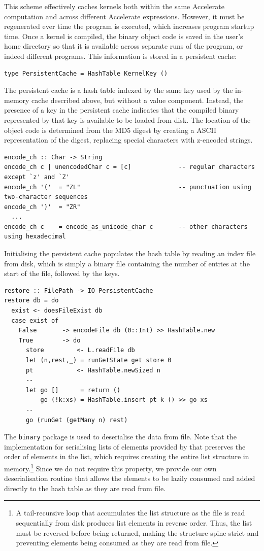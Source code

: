 This scheme effectively caches kernels both within the same Accelerate
computation and across different Accelerate expressions. However, it must be
regenerated ever time the program is executed, which increases program startup
time. Once a kernel is compiled, the binary object code is saved in the user's
home directory so that it is available across separate runs of the program, or
indeed different programs. This information is stored in a persistent cache:
%
\begin{lstlisting}[style=haskell,numbers=none]
type PersistentCache = HashTable KernelKey ()
\end{lstlisting}

The persistent cache is a hash table indexed by the same key used by the
in-memory cache described above, but without a value component. Instead, the
presence of a key in the persistent cache indicates that the compiled binary
represented by that key is available to be loaded from disk. The location of the
object code is determined from the MD5 digest by creating a ASCII representation
of the digest, replacing special characters with z-encoded strings.
%
\begin{lstlisting}[style=haskell]
encode_ch :: Char -> String
encode_ch c | unencodedChar c = [c]             -- regular characters except `z' and `Z'
encode_ch '('  = "ZL"                           -- punctuation using two-character sequences
encode_ch ')'  = "ZR"
  ...
encode_ch c    = encode_as_unicode_char c       -- other characters using hexadecimal
\end{lstlisting}

Initialising the persistent cache populates the hash table by reading an index
file from disk, which is simply a binary file containing the number of entries
at the start of the file, followed by the keys.
%
\begin{lstlisting}[style=haskell]
restore :: FilePath -> IO PersistentCache
restore db = do
  exist <- doesFileExist db
  case exist of
    False       -> encodeFile db (0::Int) >> HashTable.new
    True        -> do
      store         <- L.readFile db
      let (n,rest,_) = runGetState get store 0
      pt            <- HashTable.newSized n
      --
      let go []      = return ()
          go (!k:xs) = HashTable.insert pt k () >> go xs
      --
      go (runGet (getMany n) rest)
\end{lstlisting}

The \texttt{binary} package is used to deserialise the data from file. Note that
the implementation for serialising lists of elements provided by that preserves
the order of elements in the list, which requires creating the entire list
structure in memory.\footnote{A tail-recursive loop that accumulates the list
structure as the file is read sequentially from disk produces list elements in
reverse order. Thus, the list must be reversed before being returned, making the
structure spine-strict and preventing elements being consumed as they are read
from file.} Since we do not require this property, we provide our own
deserialisation routine that allows the elements to be lazily consumed and added
directly to the hash table as they are read from file.

